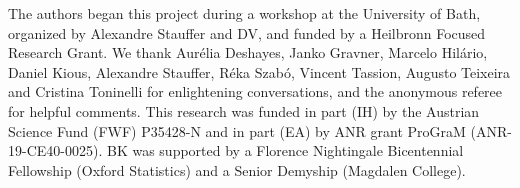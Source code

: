 \documentclass[pdflatex,sn-mathphys-num]{sn-jnl}%
\newcommand{\1}{{\ensuremath{\mathbf{1}}} }
\theoremstyle{thmstyleone}%
\theoremstyle{thmstyletwo}%
\theoremstyle{thmstylethree}%
\begin{document}

\backmatter


The authors began this project during a workshop at the 
University of Bath, organized by Alexandre Stauffer and DV, 
and funded by a Heilbronn Focused Research Grant. 
We thank 
Aur\'elia Deshayes, 
Janko Gravner, 
Marcelo Hil\'ario, 
Daniel Kious, 
Alexandre Stauffer, 
R\'eka Szab\'o, 
Vincent Tassion, 
Augusto Teixeira 
and Cristina Toninelli 
for enlightening conversations, and the anonymous referee for helpful comments. 
This research was funded in part (IH) by the Austrian Science Fund (FWF) P35428-N 
and in part (EA) by ANR grant ProGraM (ANR-19-CE40-0025). 
BK was supported by a Florence Nightingale Bicentennial Fellowship 
(Oxford Statistics) and a Senior Demyship (Magdalen College). 

\end{document}

